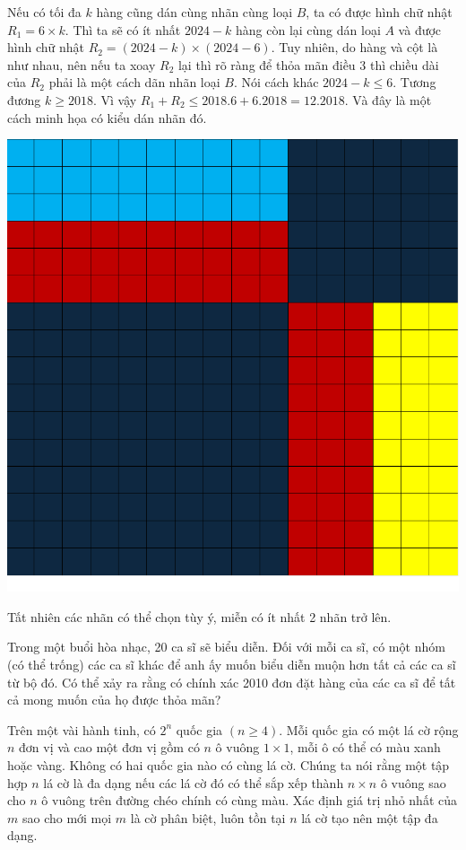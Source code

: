 \documentclass[11pt]{scrartcl}
\begin{document}
\begin{itemize}[label=, leftmargin=0em, itemsep=0.5em]
\begin{sol}
        Nếu có tối đa $k$ hàng cũng dán cùng nhãn cùng loại $B$, ta có được hình chữ nhật $R_1 = 6\times k$. Thì ta sẽ có ít nhất $2024 - k$ hàng còn lại cùng dán loại $A$ và được hình chữ nhật $R_2 = (2024-k)\times(2024-6)$. Tuy nhiên, do hàng và cột là như nhau, nên nếu ta xoay $R_2$ lại thì rõ ràng để thỏa mãn điều 3 thì chiều dài của $R_2$ phải là một cách dãn nhãn loại $B$. Nói cách khác $2024 - k \leq 6$. Tương đương $k \geq 2018$. Vì vậy $R_1 + R_2 \leq 2018.6 + 6.2018 = 12.2018$. Và đây là một cách minh họa có kiểu dán nhãn đó.
        \begin{center}
            \includegraphics[scale=0.3]{tst.pdf}
        \end{center}
        Tất nhiên các nhãn có thể chọn tùy ý, miễn có ít nhất 2 nhãn trở lên.
    \end{sol}
    \begin{btvn}
        Trong một buổi hòa nhạc, 20 ca sĩ sẽ biểu diễn. Đối với mỗi ca sĩ, có một nhóm (có thể trống) các ca sĩ khác để anh ấy muốn biểu diễn muộn hơn tất cả các ca sĩ từ bộ đó. Có thể xảy ra rằng có chính xác 2010 đơn đặt hàng của các ca sĩ để tất cả mong muốn của họ được thỏa mãn?
    \end{btvn}
    \begin{btvn}
        Trên một vài hành tinh, có $2^n$ quốc gia $(n \geq 4)$. Mỗi quốc gia có một lá cờ rộng $n$ đơn vị và cao một đơn vị gồm có $n$ ô vuông $1\times 1$, mỗi ô có thể có màu xanh hoặc vàng. Không có hai quốc gia nào có cùng lá cờ. Chúng ta nói rằng một tập hợp $n$ lá cờ là đa dạng nếu các lá cờ đó có thể sắp xếp thành $n \times n$ ô vuông sao cho $n$ ô vuông trên đường chéo chính có cùng màu. Xác định giá trị nhỏ nhất của $m$ sao cho mới mọi $m$ là cờ phân biệt, luôn tồn tại $n$ lá cờ tạo nên một tập đa dạng.

\end{btvn}
\end{itemize}
\end{document}
